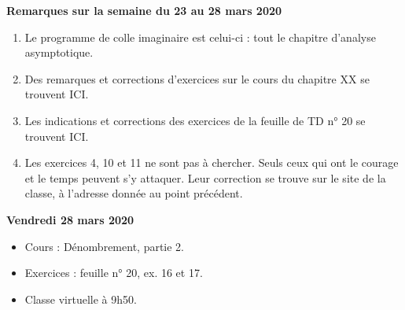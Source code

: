 \documentclass[12pt,a4paper]{article}
\begin{document}
% 
% 
% 
% 

\noindent\textbf{\bf Remarques sur la semaine du 23 au 28 mars 2020}
\begin{enumerate}
\item Le programme de colle imaginaire est celui-ci : tout le chapitre d'analyse asymptotique.
\item Des remarques et corrections d'exercices sur le cours du chapitre XX se trouvent ICI.
\item Les indications et corrections des exercices de la feuille de TD n° 20 se trouvent ICI.
\item Les exercices 4, 10 et 11 ne sont pas à chercher. Seuls ceux qui ont le courage et le temps peuvent s'y attaquer. Leur correction se trouve sur le site de la classe, à l'adresse donnée au point précédent.
\end{enumerate}

\noindent\textbf{\bf Vendredi 28 mars 2020}
\begin{itemize}
\item Cours : Dénombrement, partie 2.
\item Exercices : feuille n° 20, ex. 16 et 17.
\item Classe virtuelle à 9h50.\vspace{.4cm}
\end{itemize}
\end{document}
